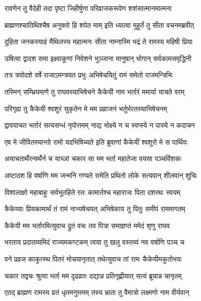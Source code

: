
\twolineshloka
{रावणेन तु वैदेही तदा पृष्टा जिहीर्षुणा}
{परिव्राजकरूपेण शशंसात्मानमात्मना} %

\twolineshloka
{ब्राह्मणश्चातिथिश्चैष अनुक्तो हि शपेत माम्}
{इति ध्यात्वा मुहूर्तं तु सीता वचनमब्रवीत्} %

\twolineshloka
{दुहिता जनकस्याहं मैथिलस्य महात्मनः}
{सीता नाम्नास्मि भद्रं ते रामस्य महिषी प्रिया} %

\twolineshloka
{उषित्वा द्वादश समा इक्ष्वाकूणां निवेशने}
{भुञ्जाना मानुषान् भोगान् सर्वकामसमृद्धिनी} %

\twolineshloka
{तत्र त्रयोदशे वर्षे राजाऽमन्त्रयत प्रभुः}
{अभिषेचयितुं रामं समेतो राजमन्त्रिभिः} %

\twolineshloka
{तस्मिन् सम्भ्रियमाणे तु राघवस्याभिषेचने}
{कैकेयी नाम भर्तारं ममार्या याचते वरम्} %

\twolineshloka
{परिगृह्य तु कैकेयी श्वशुरं सुकृतेन मे}
{मम प्रव्राजनं भर्तुर्भरतस्याभिषेचनम्} %

\twolineshloka
{द्वावयाचत भर्तारं सत्यसन्धं नृपोत्तमम्}
{नाद्य भोक्ष्ये न च स्वप्स्ये न पास्ये न कदाचन} %

\twolineshloka
{एष मे जीवितस्यान्तो रामो यदभिषिच्यते}
{इति ब्रुवाणां कैकेयीं श्वशुरो मे स पार्थिवः} %

\twolineshloka
{अयाचतार्थैरन्वर्थैर्न च याच्ञां चकार सा}
{मम भर्ता महातेजा वयसा पञ्चविंशकः} %

\twolineshloka
{अष्टादश हि वर्षाणि मम जन्मनि गण्यते}
{रामेति प्रथितो लोके सत्यवान् शीलवान् शुचिः} %

\twolineshloka
{विशालाक्षो महाबाहुः सर्वभूतहिते रतः}
{कामार्तश्च महाराजः पिता दशरथः स्वयम्} %

\twolineshloka
{कैकेय्याः प्रियकामार्थं तं रामं नाभ्यषेचयत्}
{अभिषेकाय तु पितुः समीपं राममागतम्} %

\twolineshloka
{कैकेयी मम भर्तारमित्युवाच द्रुतं वचः}
{तव पित्रा समाज्ञप्तं ममेदं शृणु राघव} %

\twolineshloka
{भरताय प्रदातव्यमिदं राज्यमकण्टकम्}
{त्वया तु खलु वस्तव्यं नव वर्षाणि पञ्च च} %

\twolineshloka
{वने प्रव्रज काकुत्स्थ पितरं मोचयानृतात्}
{तथेत्युवाच तां रामः कैकेयीमकुतोभयः} %

\twolineshloka
{चकार तद्वचः श्रुत्वा भर्ता मम दृढव्रतः}
{दद्यान्न प्रतिगृह्णीयात् सत्यं ब्रूयान्न चानृतम्} %

\twolineshloka
{एतद् ब्राह्मण रामस्य व्रतं धृतमनुत्तमम्}
{तस्य भ्राता तु वैमात्रो लक्ष्मणो नाम वीर्यवान्} %

